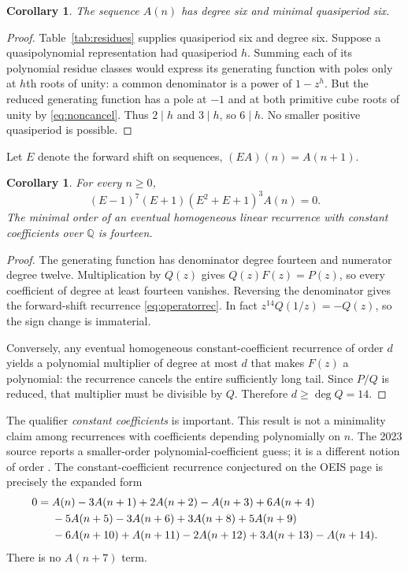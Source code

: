\documentclass[11pt]{article}
\numberwithin{equation}{section}
\newtheorem{corollary}[theorem]{Corollary}
\theoremstyle{definition}
\newcommand{\Q}{\mathbb Q}
\begin{document}
\begin{corollary}\label{cor:period}
The sequence $A(n)$ has degree six and minimal quasiperiod six.
\end{corollary}

\begin{proof}
Table~\ref{tab:residues} supplies quasiperiod six and degree six. Suppose a
quasipolynomial representation had quasiperiod $h$. Summing each of its
polynomial residue classes would express its generating function with poles
only at $h$th roots of unity: a common denominator is a power of $1-z^h$.
But the reduced generating function has a pole at $-1$ and at both primitive
cube roots of unity by \eqref{eq:noncancel}. Thus $2\mid h$ and $3\mid h$,
so $6\mid h$. No smaller positive quasiperiod is possible.
\end{proof}

Let $E$ denote the forward shift on sequences, $(EA)(n)=A(n+1)$.

\begin{corollary}\label{cor:recurrence}
For every $n\geq0$,
\begin{equation}\label{eq:operatorrec}
 (E-1)^7(E+1)(E^2+E+1)^3A(n)=0.
\end{equation}
The minimal order of an eventual homogeneous linear recurrence with constant
coefficients over $\Q$ is fourteen.
\end{corollary}

\begin{proof}
The generating function has denominator degree fourteen and numerator degree
twelve. Multiplication by $Q(z)$ gives $Q(z)F(z)=P(z)$, so every coefficient
of degree at least fourteen vanishes. Reversing the denominator gives the
forward-shift recurrence \eqref{eq:operatorrec}. In fact
$z^{14}Q(1/z)=-Q(z)$, so the sign change is immaterial.

Conversely, any eventual homogeneous constant-coefficient recurrence of order
$d$ yields a polynomial multiplier of degree at most $d$ that makes $F(z)$ a
polynomial: the recurrence cancels the entire sufficiently long tail. Since
$P/Q$ is reduced, that multiplier must be divisible by $Q$. Therefore
$d\geq\deg Q=14$.
\end{proof}

The qualifier \emph{constant coefficients} is important. This result is not
a minimality claim among recurrences with coefficients depending polynomially
on $n$. The 2023 source reports a smaller-order polynomial-coefficient guess;
it is a different notion of order \cite{kk}. The constant-coefficient
recurrence conjectured on the OEIS page is precisely the expanded form
\begin{align}\label{eq:expandedrec}
0={}&A(n)-3A(n+1)+2A(n+2)-A(n+3)+6A(n+4)\notag\\
 &-5A(n+5)-3A(n+6)+3A(n+8)+5A(n+9)\notag\\
 &-6A(n+10)+A(n+11)-2A(n+12)+3A(n+13)-A(n+14).
\end{align}
There is no $A(n+7)$ term.
\end{document}
